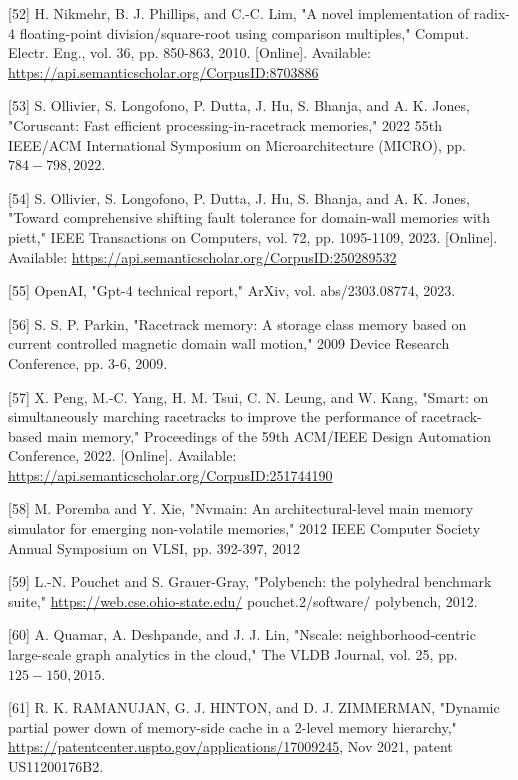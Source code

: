 \documentclass[10pt]{article}
\begin{document}
[52] H. Nikmehr, B. J. Phillips, and C.-C. Lim, "A novel implementation of radix-4 floating-point division/square-root using comparison multiples," Comput. Electr. Eng., vol. 36, pp. 850-863, 2010. [Online]. Available: \href{https://api.semanticscholar.org/CorpusID:8703886}{https://api.semanticscholar.org/CorpusID:8703886}

[53] S. Ollivier, S. Longofono, P. Dutta, J. Hu, S. Bhanja, and A. K. Jones, "Coruscant: Fast efficient processing-in-racetrack memories," 2022 55th IEEE/ACM International Symposium on Microarchitecture (MICRO), pp. $784-798,2022$.

[54] S. Ollivier, S. Longofono, P. Dutta, J. Hu, S. Bhanja, and A. K. Jones, "Toward comprehensive shifting fault tolerance for domain-wall memories with piett," IEEE Transactions on Computers, vol. 72, pp. 1095-1109, 2023. [Online]. Available: \href{https://api.semanticscholar.org/CorpusID:250289532}{https://api.semanticscholar.org/CorpusID:250289532}

[55] OpenAI, "Gpt-4 technical report," ArXiv, vol. abs/2303.08774, 2023.

[56] S. S. P. Parkin, "Racetrack memory: A storage class memory based on current controlled magnetic domain wall motion," 2009 Device Research Conference, pp. 3-6, 2009.

[57] X. Peng, M.-C. Yang, H. M. Tsui, C. N. Leung, and W. Kang, "Smart: on simultaneously marching racetracks to improve the performance of racetrack-based main memory," Proceedings of the 59th ACM/IEEE Design Automation Conference, 2022. [Online]. Available: \href{https://api.semanticscholar.org/CorpusID:251744190}{https://api.semanticscholar.org/CorpusID:251744190}

[58] M. Poremba and Y. Xie, "Nvmain: An architectural-level main memory simulator for emerging non-volatile memories," 2012 IEEE Computer Society Annual Symposium on VLSI, pp. 392-397, 2012

[59] L.-N. Pouchet and S. Grauer-Gray, "Polybench: the polyhedral benchmark suite," \href{https://web.cse.ohio-state.edu/}{https://web.cse.ohio-state.edu/} pouchet.2/software/ polybench, 2012.

[60] A. Quamar, A. Deshpande, and J. J. Lin, "Nscale: neighborhood-centric large-scale graph analytics in the cloud," The VLDB Journal, vol. 25, pp. $125-150,2015$.

[61] R. K. RAMANUJAN, G. J. HINTON, and D. J. ZIMMERMAN, "Dynamic partial power down of memory-side cache in a 2-level memory hierarchy," \href{https://patentcenter.uspto.gov/applications/17009245}{https://patentcenter.uspto.gov/applications/17009245}, Nov 2021, patent US11200176B2.
\end{document}
